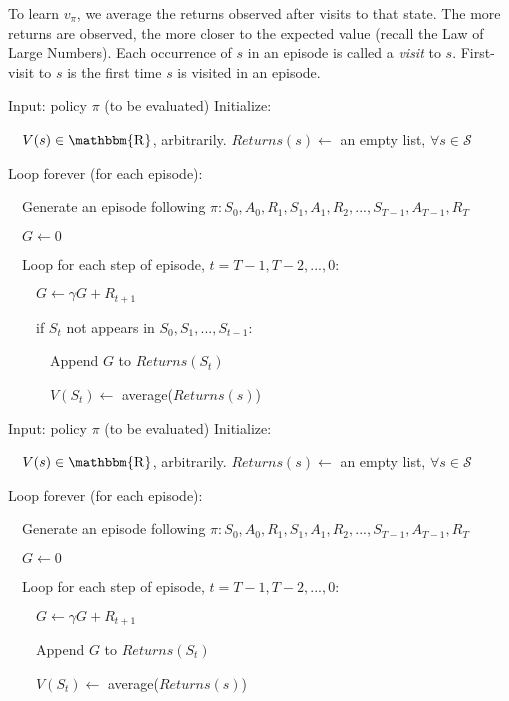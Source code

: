 \documentclass[lang=en,mode=geye,device=normal,color=blue,14pt]{elegantnote}
\DeclareMathOperator*{\1}{\mathbbm{1}}
\DeclareMathOperator*{\R}{\mathbbm{R}}
\begin{document}
To learn $v_\pi$, we average the returns observed after visits to that state. The more returns are observed, the more closer to the expected value (recall the Law of Large Numbers). Each occurrence of $s$ in an episode is called a \textit{visit} to $s$. First-visit to $s$ is the first time $s$ is visited in an episode.

\begin{tcolorbox}[width=1.1\textwidth,title={First-visit MC prediction, for estimating $V \approx v_\pi$}]
Input: policy $\pi$ (to be evaluated)
Initialize:

$\quad V(s) \in \R$, arbitrarily.
$Returns(s) \leftarrow$ an empty list, $\forall s \in \mathcal{S}$

Loop forever (for each episode):

$\quad$Generate an episode following $\pi : S_0, A_0, R_1, S_1, A_1, R_2, ..., S_{T-1}, A_{T-1}, R_T$

$\quad G \leftarrow 0$

$\quad$Loop for each step of episode, $t = T-1, T-2, ..., 0:$

$\quad\quad G \leftarrow \gamma G + R_{t+1}$

$\quad\quad$if $S_t$ not appears in $S_0, S_1, ..., S_{t-1}:$

$\quad\quad\quad$Append $G$ to $Returns(S_t)$

$\quad\quad\quad V(S_t) \leftarrow$ average($Returns(s)$)
\end{tcolorbox}

\begin{tcolorbox}[width=1.1\textwidth,title={Every-visit MC prediction, for estimating $V \approx v_\pi$}]
Input: policy $\pi$ (to be evaluated)
Initialize:

$\quad V(s) \in \R$, arbitrarily.
$Returns(s) \leftarrow$ an empty list, $\forall s \in \mathcal{S}$

Loop forever (for each episode):

$\quad$Generate an episode following $\pi : S_0, A_0, R_1, S_1, A_1, R_2, ..., S_{T-1}, A_{T-1}, R_T$

$\quad G \leftarrow 0$

$\quad$Loop for each step of episode, $t = T-1, T-2, ..., 0:$

$\quad\quad G \leftarrow \gamma G + R_{t+1}$

$\quad\quad$Append $G$ to $Returns(S_t)$

$\quad\quad V(S_t) \leftarrow$ average($Returns(s)$)
\end{tcolorbox}
\end{document}
